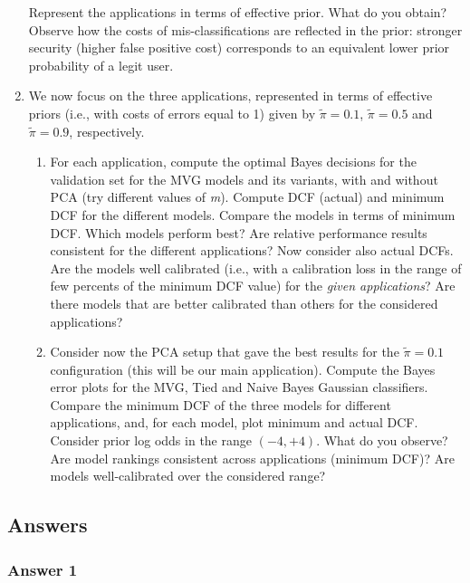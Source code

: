 \documentclass[a4paper, 12pt, english]{article}
\begin{document}
\begin{enumerate}
\begin{itemize}
        \end{itemize}
        Represent the applications in terms of effective prior. What do you obtain? Observe how the costs of mis-classifications are reflected in the prior: stronger security (higher false positive cost) corresponds to an equivalent lower prior probability of a legit user.
        \item We now focus on the three applications, represented in terms of effective priors (i.e., with costs of errors equal to 1) given by \(\widetilde{\pi} = 0.1\), \(\widetilde{\pi} = 0.5\) and \(\widetilde{\pi} = 0.9 \), respectively.
        \begin{enumerate}
            \item For each application, compute the optimal Bayes decisions for the validation set for the MVG models and its variants, with and without PCA (try different values of \textit{m}). Compute DCF (actual) and minimum DCF for the different models. Compare the models in terms of minimum DCF. Which models perform best? Are relative performance results consistent for the different applications? Now consider also actual DCFs. Are the models well calibrated (i.e., with a calibration loss in the range of few percents of the minimum DCF value) for the \textit{given applications}? Are there models that are better calibrated than others for the considered applications?
            \item Consider now the PCA setup that gave the best results for the \(\widetilde{\pi} = 0.1\) configuration (this will be our main application). Compute the Bayes error plots for the MVG, Tied and Naive Bayes Gaussian classifiers. Compare the minimum DCF of the three models for different applications, and, for each model, plot minimum and actual DCF. Consider prior log odds in the range \((-4,+4)\). What do you observe? Are model rankings consistent across applications (minimum DCF)? Are models well-calibrated over the considered range?
        \end{enumerate}


    \end{enumerate}

    \subsection{Answers}

    \subsubsection{Answer 1}
\end{document}
